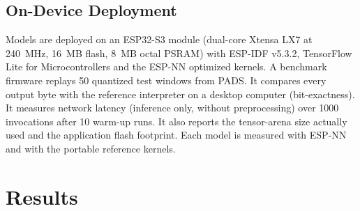 \documentclass[journal,twoside,web]{ieeecolor}
\begin{document}
\subsection{On-Device Deployment}\label{sec:device}
Models are deployed on an ESP32-S3 module (dual-core Xtensa LX7 at 240~MHz, 16~MB flash, 8~MB octal PSRAM) with ESP-IDF v5.3.2, TensorFlow Lite for Microcontrollers and the ESP-NN optimized kernels. A benchmark firmware replays 50 quantized test windows from PADS. It compares every output byte with the reference interpreter on a desktop computer (bit-exactness). It measures network latency (inference only, without preprocessing) over 1000 invocations after 10 warm-up runs. It also reports the tensor-arena size actually used and the application flash footprint. Each model is measured with ESP-NN and with the portable reference kernels.

\section{Results}
\end{document}
